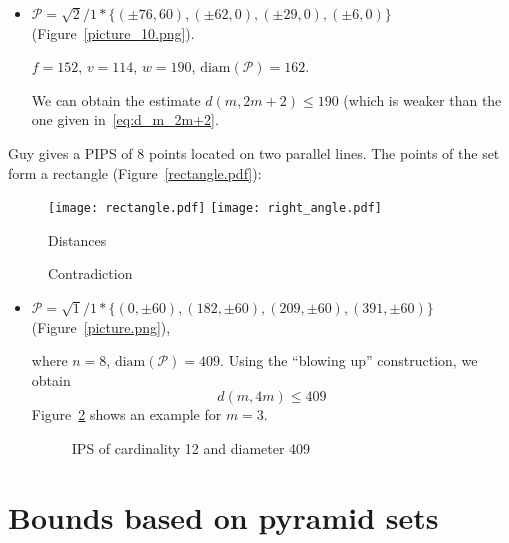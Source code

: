 \documentclass[12pt]{article}
\theoremstyle{theorem}
\theoremstyle{dfn}
\theoremstyle{remark}
\begin{document}
\begin{itemize}
\setlength{\itemsep}{-1mm}


\item
$\mathcal{P}=\sqrt{2}/{1} * \{ (\pm 76, 60),
(\pm 62 , 0),
(\pm 29 , 0),
(\pm 6 , 0)\}
$
(Figure~\ref{picture_10.png}).

$f = 152$, $v = 114$, $w = 190$, $\operatorname{diam(\mathcal{P})} = 162$.

We can obtain the estimate $d(m, 2m + 2) \leq 190$ (which
is weaker than the one given in~\eqref{eq:d_m_2m+2}.

\end{itemize}

Guy gives \cite[D 20]{guy2013unsolved} a PIPS of $8$ points located
on two parallel lines. The points of the set form a rectangle
(Figure~\ref{rectangle.pdf}):

\begin{figure}[htbp]
	\texttt{[image: rectangle.pdf]}
	\hfill
	\texttt{[image: right\_angle.pdf]}
	\\
	\parbox{.65\linewidth}{\caption{Distances}
	\label{rectangle.pdf}}
	\hfill
	\parbox{.5\linewidth}{\caption{Contradiction}
	\label{right_angle.pdf}}
\end{figure}

\begin{itemize}
\setlength{\itemsep}{-1mm}


\item
$\mathcal{P}=\sqrt{1}/{1} * \{ (0, \pm 60),
(182 , \pm 60),
(209 , \pm 60),
(391 , \pm 60)\}
$
(Figure~\ref{picture.png}),

where $n = 8$, $\operatorname{diam(\mathcal{P})} = 409$. Using the ``blowing up''
construction, we obtain
\begin{equation}\label{result1}
d(m, 4m) \leq 409
\end{equation}
Figure~\ref{picture_11.pdf} shows an example for $m = 3$.


\begin{figure}[h!]
\parbox{1\linewidth}{\caption{IPS of cardinality 12 and diameter 409}
\label{picture_11.pdf}}
\end{figure}


\end{itemize}

\section{Bounds based on pyramid sets}
\label{sec:bounds_pyramid}
\end{document}
